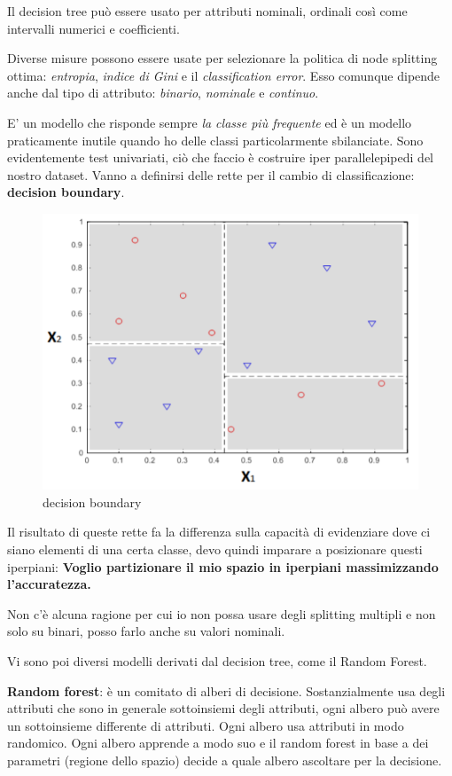 Il decision tree può essere usato per attributi nominali, ordinali così come intervalli numerici e coefficienti.
 
Diverse misure possono essere usate per selezionare la politica di node splitting ottima: \textit{entropia}, \textit{indice di Gini} e il \textit{classification error}. Esso comunque dipende anche dal tipo di attributo: \textit{binario}, \textit{nominale} e \textit{continuo}. 

E' un modello che risponde sempre \textit{la classe più frequente} ed è un modello praticamente inutile quando ho delle classi particolarmente sbilanciate. Sono evidentemente test univariati, ciò che faccio è costruire iper parallelepipedi del nostro dataset. Vanno a definirsi delle rette per il cambio di classificazione: \textbf{decision boundary}.

\begin{figure}[H]
	\centering
	\includegraphics[height=0.5 \linewidth]{classification/pict/decision_boundary.png}
	\caption{decision boundary}
\end{figure}

Il risultato di queste rette fa la differenza sulla capacità di evidenziare dove ci siano elementi di una certa classe, devo quindi imparare a posizionare questi iperpiani: \textbf{Voglio partizionare il mio spazio in iperpiani massimizzando l'accuratezza.}

Non c'è alcuna ragione per cui io non possa usare degli splitting multipli e non solo su binari, posso farlo anche su valori nominali.

Vi sono poi diversi modelli derivati dal decision tree, come il Random Forest.

\textbf{Random forest}: \`e un comitato di alberi di decisione. Sostanzialmente usa degli attributi che sono in generale sottoinsiemi degli attributi, ogni albero può avere un sottoinsieme differente di attributi. Ogni albero usa attributi in modo randomico. Ogni albero apprende a modo suo e il random forest in base a dei parametri (regione dello spazio) decide a quale albero ascoltare per la decisione.

